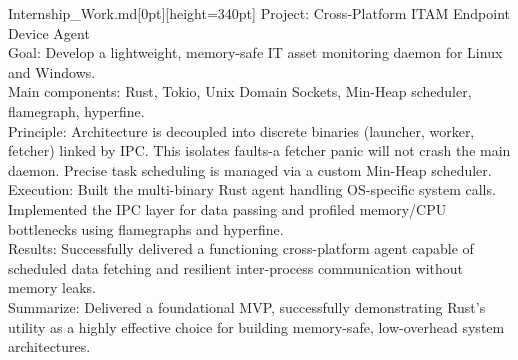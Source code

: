 \twmhline

\begin{twmnotebook}{Internship\_Work.md}[0pt][height=340pt]
    \textcolor{chillblue}{Project: Cross-Platform ITAM Endpoint Device Agent}\\
    \textbullet \quad \textcolor{chillgreen}{Goal:} Develop a lightweight, memory-safe IT asset monitoring daemon for Linux and Windows.\\
    \textbullet \quad \textcolor{chillgreen}{Main components:} Rust, Tokio, Unix Domain Sockets, Min-Heap scheduler, flamegraph, hyperfine.\\
    \textbullet \quad \textcolor{chillgreen}{Principle:} Architecture is decoupled into discrete binaries (launcher, worker, fetcher) linked by IPC. This isolates faults-a fetcher panic will not crash the main daemon. Precise task scheduling is managed via a custom Min-Heap scheduler.\\
    \textbullet \quad \textcolor{chillgreen}{Execution:} Built the multi-binary Rust agent handling OS-specific system calls. Implemented the IPC layer for data passing and profiled memory/CPU bottlenecks using flamegraphs and hyperfine.\\
    \textbullet \quad \textcolor{chillgreen}{Results:} Successfully delivered a functioning cross-platform agent capable of scheduled data fetching and resilient inter-process communication without memory leaks.\\
    \textbullet \quad \textcolor{chillgreen}{Summarize:} Delivered a foundational MVP, successfully demonstrating Rust's utility as a highly effective choice for building memory-safe, low-overhead system architectures.
\end{twmnotebook}%
\twmgap%
